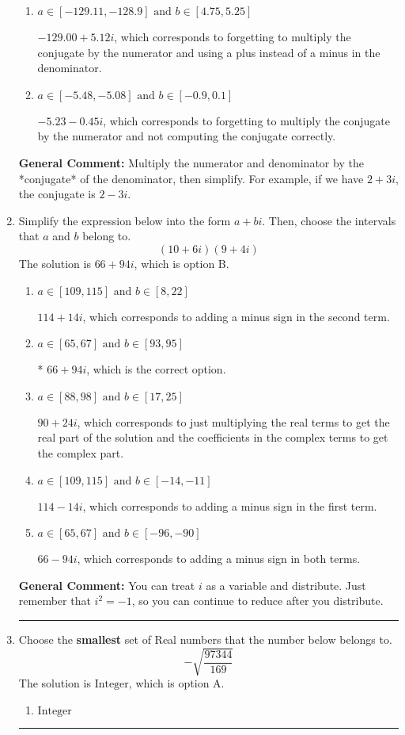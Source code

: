 \documentclass{extbook}[14pt]
\newcommand{\litem}[1]{\item #1

\rule{\textwidth}{0.4pt}}
\begin{document}
\begin{enumerate}
{\begin{enumerate}[label=\Alph*.]
* $-1.14  + 5.12 i$, which is the correct option.
\item \( a \in [-129.11, -128.9] \text{ and } b \in [4.75, 5.25] \)

 $-129.00  + 5.12 i$, which corresponds to forgetting to multiply the conjugate by the numerator and using a plus instead of a minus in the denominator.
\item \( a \in [-5.48, -5.08] \text{ and } b \in [-0.9, 0.1] \)

 $-5.23  - 0.45 i$, which corresponds to forgetting to multiply the conjugate by the numerator and not computing the conjugate correctly.
\end{enumerate}

\textbf{General Comment:} Multiply the numerator and denominator by the *conjugate* of the denominator, then simplify. For example, if we have $2+3i$, the conjugate is $2-3i$.
}
\litem{
Simplify the expression below into the form $a+bi$. Then, choose the intervals that $a$ and $b$ belong to.
\[ (10 + 6 i)(9 + 4 i) \]
The solution is \( 66 + 94 i \), which is option B.\begin{enumerate}[label=\Alph*.]
\item \( a \in [109, 115] \text{ and } b \in [8, 22] \)

 $114 + 14 i$, which corresponds to adding a minus sign in the second term.
\item \( a \in [65, 67] \text{ and } b \in [93, 95] \)

* $66 + 94 i$, which is the correct option.
\item \( a \in [88, 98] \text{ and } b \in [17, 25] \)

 $90 + 24 i$, which corresponds to just multiplying the real terms to get the real part of the solution and the coefficients in the complex terms to get the complex part.
\item \( a \in [109, 115] \text{ and } b \in [-14, -11] \)

 $114 - 14 i$, which corresponds to adding a minus sign in the first term.
\item \( a \in [65, 67] \text{ and } b \in [-96, -90] \)

 $66 - 94 i$, which corresponds to adding a minus sign in both terms.
\end{enumerate}

\textbf{General Comment:} You can treat $i$ as a variable and distribute. Just remember that $i^2=-1$, so you can continue to reduce after you distribute.
}
\litem{
Choose the \textbf{smallest} set of Real numbers that the number below belongs to.
\[ -\sqrt{\frac{97344}{169}} \]
The solution is \( \text{Integer} \), which is option A.\begin{enumerate}[label=\Alph*.]
\item \( \text{Integer} \)


\end{enumerate}}
\end{enumerate}
\end{document}
